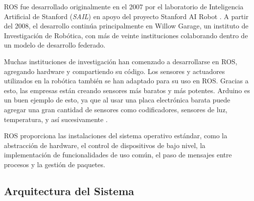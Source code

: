 ROS fue desarrollado originalmente en el 2007 por el laboratorio de 
Inteligencia Artificial de Stanford (\textit{SAIL}) en apoyo del proyecto 
Stanford AI Robot \cite{rosHistory}. A partir del 2008, el desarrollo 
contin\'ua principalmente en Willow Garage, un instituto de Investigaci\'on 
de Rob\'otica, con m\'as de veinte instituciones colaborando dentro de un 
modelo de desarrollo federado.

Muchas instituciones de investigaci\'on han comenzado a desarrollarse en 
ROS, agregando hardware y compartiendo su c\'odigo. Los sensores y actuadores 
utilizados en la rob\'otica tambi\'en se han adaptado para su uso en ROS. Gracias 
a esto, las empresas est\'an creando sensores m\'as baratos y m\'as potentes. Arduino 
es un buen ejemplo de esto, ya que al usar una placa electr\'onica barata puede 
agregar una gran cantidad de sensores como codificadores, sensores de luz, 
temperatura, y as\'i sucesivamente \cite{rosIntroduction}.

ROS proporciona las instalaciones del sistema operativo est\'andar, como 
la abstracci\'on de hardware, el control de dispositivos de bajo nivel, la 
implementaci\'on de funcionalidades de uso com\'un, el paso de mensajes entre 
procesos y la gesti\'on de paquetes. %

\subsection{Arquitectura del Sistema}




